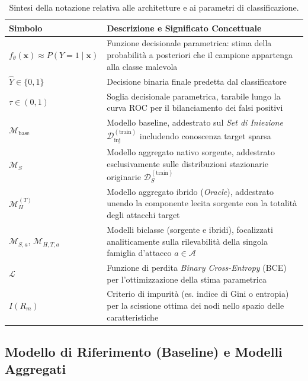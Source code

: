 \begin{table}[H]
    \centering
    \caption{Sintesi della notazione relativa alle architetture e ai parametri di classificazione.}
    \label{tab:notazione_modelli}
    \begin{tabularx}{\textwidth}{l >{\raggedright\arraybackslash}X}
    \toprule
    \textbf{Simbolo} & \textbf{Descrizione e Significato Concettuale} \\
    \midrule
    $f_\theta(\mathbf{x}) \approx P(Y=1 \mid \mathbf{x})$ &
    Funzione decisionale parametrica: stima della probabilità a posteriori che il campione appartenga alla classe malevola \\
    $\hat{Y} \in \{0, 1\}$ &
    Decisione binaria finale predetta dal classificatore \\
    $\tau \in (0, 1)$ &
    Soglia decisionale parametrica, tarabile lungo la curva ROC per il bilanciamento dei falsi positivi \\
    $\mathcal{M}_{\text{base}}$ &
    Modello baseline, addestrato sul \textit{Set di Iniezione} $\mathcal{D}_{\text{inj}}^{(\text{train})}$ includendo conoscenza target sparsa \\
    $\mathcal{M}_{S}$ &
    Modello aggregato nativo sorgente, addestrato esclusivamente sulle distribuzioni stazionarie originarie $\mathcal{D}_{S}^{(\text{train})}$ \\
    $\mathcal{M}_{H}^{(T)}$ &
    Modello aggregato ibrido (\textit{Oracle}), addestrato unendo la componente lecita sorgente con la totalità degli attacchi target \\
    $\mathcal{M}_{S,a}$, $\mathcal{M}_{H,T,a}$ &
    Modelli biclasse (sorgente e ibridi), focalizzati analiticamente sulla rilevabilità della singola famiglia d'attacco $a \in \mathcal{A}$ \\
    $\mathcal{L}$ &
    Funzione di perdita \textit{Binary Cross-Entropy} (BCE) per l'ottimizzazione della stima parametrica \\
    $I(R_m)$ &
    Criterio di impurità (es. indice di Gini o entropia) per la scissione ottima dei nodi nello spazio delle caratteristiche \\
    \bottomrule
    \end{tabularx}
\end{table}

\subsection{Modello di Riferimento (Baseline) e Modelli Aggregati}
\label{subsec:modelli_aggregati}


